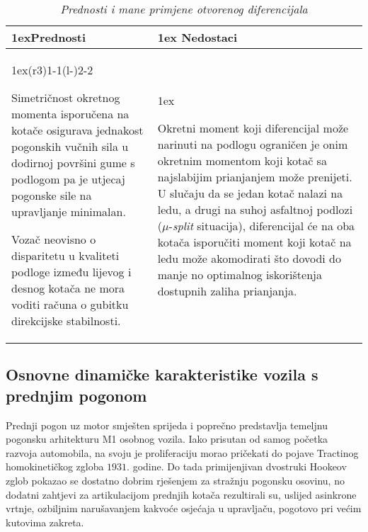 \documentclass[11pt]{article}
\numberwithin{equation}{section}%
\begin{document}
\begin{table}[ht]%
\begin{tabularx}{\linewidth}{>{\parskip1ex}X@{\kern4\tabcolsep}>{\parskip1ex}X}
\toprule
\hfil\bfseries Prednosti
&
\hfil\bfseries Nedostaci
\\\cmidrule(r{3\tabcolsep}){1-1}\cmidrule(l{-\tabcolsep}){2-2}

Simetričnost okretnog momenta isporučena na kotače osigurava jednakost pogonskih vučnih sila u dodirnoj površini gume s podlogom pa je utjecaj pogonske sile na upravljanje minimalan.\par
Vozač neovisno o disparitetu u kvaliteti podloge između lijevog i desnog kotača ne mora voditi računa o gubitku direkcijske stabilnosti.\par


&

Okretni moment koji diferencijal može narinuti na podlogu ograničen je onim okretnim momentom koji kotač sa najslabijim prianjanjem može prenijeti. U slučaju da se jedan kotač nalazi na ledu, a drugi na suhoj asfaltnoj podlozi ($\mu$-\textit{split} situacija), diferencijal će na oba kotača isporučiti moment koji kotač na ledu može akomodirati što dovodi do manje no optimalnog iskorištenja dostupnih zaliha prianjanja.

\\\bottomrule
\end{tabularx}
\caption{\textit{Prednosti i mane primjene otvorenog diferencijala}}
\label{tab1}
\end{table} 

\subsection{Osnovne dinamičke karakteristike vozila s prednjim pogonom}
Prednji pogon uz motor smješten sprijeda i poprečno predstavlja temeljnu pogonsku arhitekturu M1 osobnog vozila. Iako prisutan od samog početka razvoja automobila, na svoju je proliferaciju morao pričekati do pojave Tractinog homokinetičkog zgloba $1931.$ godine. Do tada primijenjivan dvostruki Hookeov zglob pokazao se dostatno dobrim rješenjem za stražnju pogonsku osovinu, no dodatni zahtjevi za artikulacijom prednjih kotača rezultirali su, uslijed asinkrone vrtnje, ozbiljnim narušavanjem kakvoće osjećaja u upravljaču, pogotovo pri većim kutovima zakreta.
\end{document}
